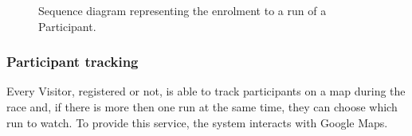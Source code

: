             \begin{figure}[H]
                \centering
                \caption{Sequence diagram representing the enrolment to a run of a Participant.}
                \label{fig:T4R-participant-enrolment}
            \end{figure}
            
        \subsubsection{Participant tracking}
            
            Every Visitor, registered or not, is able to track participants on a map during the race and, if there is more then one run at the same time, they can choose which run to watch. To provide this service, the system interacts with Google Maps.
            
